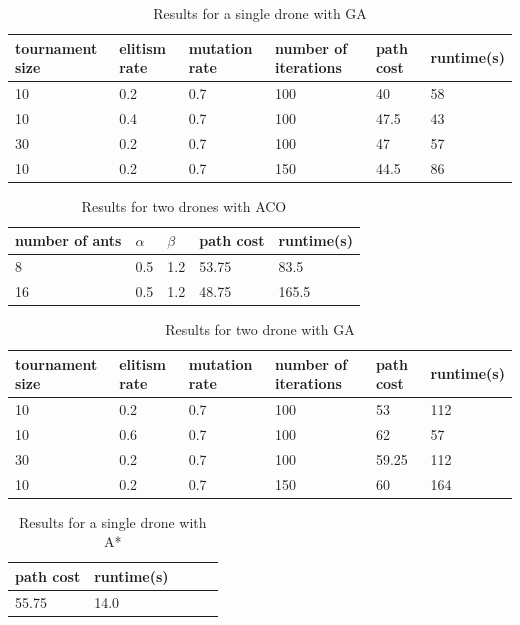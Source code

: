 \documentclass[conference]{IEEEtran}
\begin{document}
\begin{table}[H]
\centering
\begin{tabular}{ | m{1.5cm} | m{1cm}| m{1cm} | m{1.5cm} | m{1.5cm} | m{1.5cm} |} 
\hline
tournament size & elitism rate & mutation rate & number of iterations & path cost & runtime(s) \\ 
\hline
10 & 0.2 & 0.7 & 100 & 40 & 58 \\ 
\hline
10 & 0.4 & 0.7 & 100 & 47.5 &  43  \\ 
\hline
30 & 0.2 & 0.7 & 100 & 47 &  57  \\ 
\hline
10 & 0.2 & 0.7 & 150 & 44.5 &  86  \\ 
\hline
\end{tabular}
\caption{Results for a single drone with GA} \label{tab:single_ga}
\end{table}

\begin{table}[H]
\centering
\begin{tabular}{ | m{1cm} | m{1cm}| m{1cm} | m{1.5cm} | m{1.5cm} |} 
\hline
number of ants & $\alpha$ & $\beta$ & path cost & runtime(s) \\ 
\hline
8 & 0.5 & 1.2 & 53.75 & 83.5 \\ 
\hline
16 & 0.5 & 1.2 & 48.75 & 165.5 \\ 
\hline
\end{tabular}
\caption{Results for two drones with ACO} \label{tab:double_aco}
\end{table}

\begin{table}[H]
\centering
\begin{tabular}{ | m{1.5cm} | m{1cm}| m{1cm} | m{1.5cm} | m{1.5cm} | m{1.5cm} |} 
\hline
tournament size & elitism rate & mutation rate & number of iterations & path cost & runtime(s) \\ 
\hline
10 & 0.2 & 0.7 & 100 & 53 & 112 \\ 
\hline
10 & 0.6 & 0.7 & 100 & 62 & 57  \\ 
\hline
30 & 0.2 & 0.7 & 100 & 59.25 & 112  \\ 
\hline
10 & 0.2 & 0.7 & 150 & 60 & 164  \\ 
\hline
\end{tabular}
\caption{Results for two drone with GA} \label{tab:double_ga}
\end{table}

\begin{table}[H]
\centering
\begin{tabular}{ | m{1cm} | m{1cm}| m{1cm} | m{1.5cm} | m{1.5cm} |} 
\hline
path cost & runtime(s) \\ 
\hline
55.75 & 14.0 \\
\hline
\end{tabular}
\caption{Results for a single drone with A*} \label{tab:single_a}
\end{table}
\end{document}
